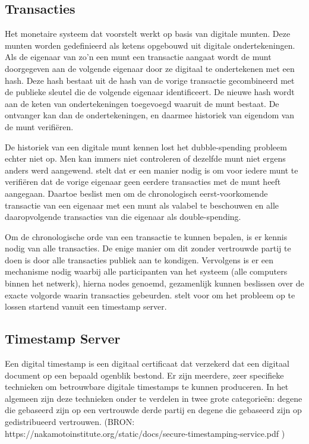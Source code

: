 	\subsection{Transacties}
	Het monetaire systeem dat \textcite{Nakamoto2008} voorstelt werkt op basis van digitale munten. Deze munten worden gedefinieerd als ketens opgebouwd uit digitale ondertekeningen. Als de eigenaar van zo’n een munt een transactie aangaat wordt de munt doorgegeven aan de volgende eigenaar door ze digitaal te ondertekenen met een hash. Deze hash bestaat uit de hash van de vorige transactie gecombineerd met de publieke sleutel die de volgende eigenaar identificeert. De nieuwe hash wordt aan de keten van ondertekeningen toegevoegd waaruit de munt bestaat. De ontvanger kan dan de ondertekeningen, en daarmee historiek van eigendom van de munt verifiëren. 
			
	De historiek van een digitale munt kennen lost het dubble-spending probleem echter niet op. Men kan immers niet controleren of dezelfde munt niet ergens anders werd aangewend. \textcite{Nakamoto2008} stelt dat er een manier nodig is om voor iedere munt te verifiëren dat de vorige eigenaar geen eerdere transacties met de munt heeft aangegaan. Daartoe beslist men om de chronologisch eerst-voorkomende transactie van een eigenaar met een munt als valabel te beschouwen en alle daaropvolgende transacties van die eigenaar als double-spending. 
			
	Om de chronologische orde van een transactie te kunnen bepalen, is er kennis nodig van alle transacties. De enige manier om dit zonder vertrouwde partij te doen is door alle transacties publiek aan te kondigen. Vervolgens is er een mechanisme nodig waarbij alle participanten van het systeem (alle computers binnen het netwerk), hierna nodes genoemd, gezamenlijk kunnen beslissen over de exacte volgorde waarin transacties gebeurden. \textcite{Nakamoto2008} stelt voor om het probleem op te lossen startend vanuit een timestamp server. 
			
	\subsection{Timestamp Server}
	Een digital timestamp is een digitaal certificaat dat verzekerd dat een digitaal document op een bepaald ogenblik bestond. Er zijn meerdere, zeer specifieke technieken om betrouwbare digitale timestamps te kunnen produceren. In het algemeen zijn deze technieken onder te verdelen in twee grote categorieën: degene die gebaseerd zijn op een vertrouwde derde partij en degene die gebaseerd zijn op gedistribueerd vertrouwen. (BRON: https://nakamotoinstitute.org/static/docs/secure-timestamping-service.pdf )
	
